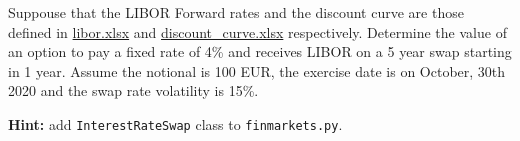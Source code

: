 %
%	
%	

\begin{question}
Suppouse that the LIBOR Forward rates and the discount curve are those defined in \href{https://drive.google.com/file/d/1dm5oZnZKmJM6UrV0L32OcqD5Tzs9SI9A/view?usp=sharing}{libor.xlsx} and \href{https://drive.google.com/file/d/14R22r7m-6VpQ_P79D3qHdK0QN_mOQ_UB/view?usp=sharing}{discount\_curve.xlsx} respectively.
Determine the value of an option to pay a fixed rate of 4\% and receives LIBOR on a 5 year swap starting in 1 year. Assume the notional is 100 EUR, the exercise date is on October, 30th 2020 and the swap rate volatility is 15\%.

\noindent\textbf{Hint:} add \texttt{InterestRateSwap} class to \texttt{finmarkets.py}.
\end{question}

